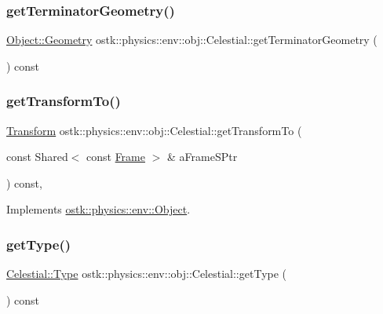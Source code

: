 \subsubsection{\texorpdfstring{get\+Terminator\+Geometry()}{getTerminatorGeometry()}}
{\footnotesize\ttfamily \hyperlink{classostk_1_1physics_1_1env_1_1_object_a66e44a65aefb23a184a6de531e96935d}{Object\+::\+Geometry} ostk\+::physics\+::env\+::obj\+::\+Celestial\+::get\+Terminator\+Geometry (\begin{DoxyParamCaption}{ }\end{DoxyParamCaption}) const}

\mbox{\label{classostk_1_1physics_1_1env_1_1obj_1_1_celestial_a8fa63af32cf8785ff6d3762d6f8dcd86}} 
\subsubsection{\texorpdfstring{get\+Transform\+To()}{getTransformTo()}}
{\footnotesize\ttfamily \hyperlink{classostk_1_1physics_1_1coord_1_1_transform}{Transform} ostk\+::physics\+::env\+::obj\+::\+Celestial\+::get\+Transform\+To (\begin{DoxyParamCaption}\item[{const Shared$<$ const \hyperlink{classostk_1_1physics_1_1coord_1_1_frame}{Frame} $>$ \&}]{a\+Frame\+S\+Ptr }\end{DoxyParamCaption}) const\hspace{0.3cm}{\ttfamily [override]}, {\ttfamily [virtual]}}



Implements \hyperlink{classostk_1_1physics_1_1env_1_1_object_a720f81e696c3f4f81de8e7ae787fdf10}{ostk\+::physics\+::env\+::\+Object}.

\mbox{\label{classostk_1_1physics_1_1env_1_1obj_1_1_celestial_ad5b0fb87f14be14519ecddd37f134719}} 
\subsubsection{\texorpdfstring{get\+Type()}{getType()}}
{\footnotesize\ttfamily \hyperlink{classostk_1_1physics_1_1env_1_1obj_1_1_celestial_aa0711d887522b35b2b3630156d912779}{Celestial\+::\+Type} ostk\+::physics\+::env\+::obj\+::\+Celestial\+::get\+Type (\begin{DoxyParamCaption}{ }\end{DoxyParamCaption}) const}

